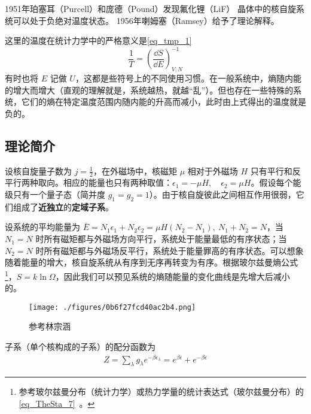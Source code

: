 
\begin{issues}
\issueDraft
\end{issues}

1951年珀塞耳（Purcell）和庞德（Pound）发现氟化锂（LiF） 晶体中的核自旋系统可以处于负绝对温度状态。
1956年喇姆塞（Ramsey）给予了理论解释。\cite{热统}

这里的温度在统计力学中的严格意义是\autoref{eq_tmp_1}~
\begin{equation}
\frac{1}{T}=\left(\frac{\dd S}{\dd E}\right)_{V,N}^{-1}
\end{equation}
有时也将 $E$ 记做 $U$，这都是些符号上的不同使用习惯。在一般系统中，熵随内能的增大而增大（直观的理解就是，系统越热，就越“乱”）。但也存在一些特殊的系统，它们的熵在特定温度范围内随内能的升高而减小，此时由上式得出的温度就是负的。

\subsection{理论简介}
设核自旋量子数为 $j=\frac{1}{2}$，在外磁场中，核磁矩 $\mu$ 相对于外磁场 $H$ 只有平行和反平行两种取向。相应的能量也只有两种取值：$\epsilon_1=-\mu H,\quad \epsilon_2=\mu H$。假设每个能级只有一个量子态（简并度 $g_1=g_2=1$）。由于核自旋彼此之间相互作用很弱，它们组成了\textbf{近独立}的\textbf{定域子系}。

设系统的平均能量为 $\bar{E}=N_1\epsilon_1+N_2\epsilon_2=\mu H(N_2-N_1),\ N_1+N_2=N$，当 $N_1=N$ 时所有磁矩都与外磁场方向平行，系统处于能量最低的有序状态；当 $N_2=N$ 时所有磁矩都与外磁场反平行，系统处于能量罪高的有序状态。可以想象随着能量的增大，核自旋系统从有序到无序再转变为有序。根据玻尔兹曼熵公式\footnote{参考玻尔兹曼分布（统计力学）或热力学量的统计表达式（玻尔兹曼分布）的\autoref{eq_TheSta_7}~。}，$S=k\ln \Omega$，因此我们可以预见系统的熵随能量的变化曲线是先增大后减小的。
\begin{figure}[ht]
\centering
\texttt{[image: ./figures/0b6f27fcd40ac2b4.png]}
\caption{参考林宗涵} \label{fig_negtem_1}
\end{figure}



子系（单个核构成的子系）的配分函数为
\begin{equation}
\begin{aligned}
Z=\sum_{\lambda}g_\lambda e^{-\beta \epsilon_\lambda}=e^{\beta \epsilon } +e^{-\beta \epsilon}
\end{aligned}
\end{equation}

